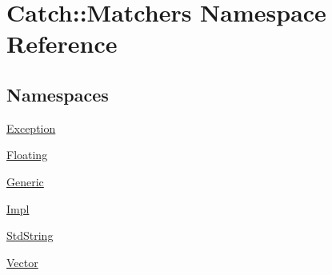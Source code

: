 \hypertarget{namespace_catch_1_1_matchers}{}\section{Catch\+:\+:Matchers Namespace Reference}
\label{namespace_catch_1_1_matchers}
\subsection*{Namespaces}
\begin{DoxyCompactItemize}
\item 
 \mbox{\hyperlink{namespace_catch_1_1_matchers_1_1_exception}{Exception}}
\item 
 \mbox{\hyperlink{namespace_catch_1_1_matchers_1_1_floating}{Floating}}
\item 
 \mbox{\hyperlink{namespace_catch_1_1_matchers_1_1_generic}{Generic}}
\item 
 \mbox{\hyperlink{namespace_catch_1_1_matchers_1_1_impl}{Impl}}
\item 
 \mbox{\hyperlink{namespace_catch_1_1_matchers_1_1_std_string}{Std\+String}}
\item 
 \mbox{\hyperlink{namespace_catch_1_1_matchers_1_1_vector}{Vector}}
\end{DoxyCompactItemize}
